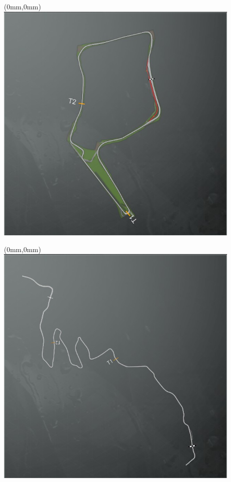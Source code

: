 \null\newpage
\begin{textblock*}{30mm}(0mm,0mm)%
\includegraphics[width=120mm]{TR/2015-05-20_00049.png}
\end{textblock*}
\null\newpage
\begin{textblock*}{30mm}(0mm,0mm)%
\includegraphics[width=120mm]{TR/2015-05-20_00004.png}
\end{textblock*}
